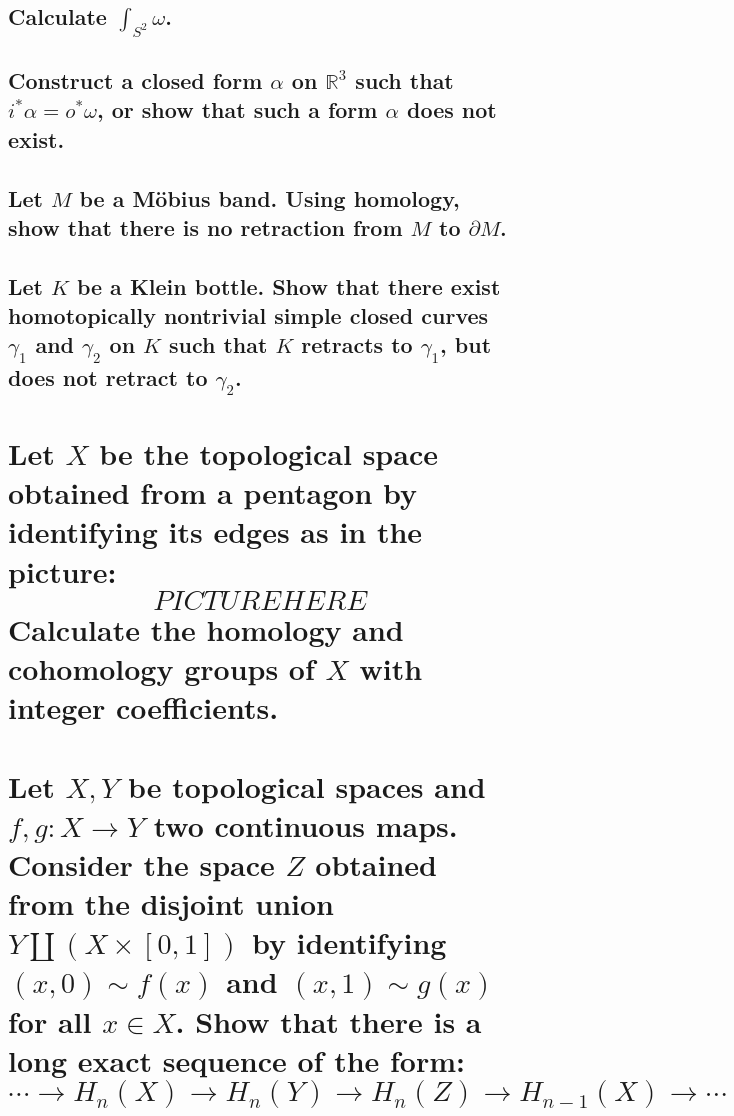 \documentclass[10pt]{article}
\newcommand{\del}{\ensuremath{\partial}}
\newcommand{\advsection}{\addtocounter{section}{1} \setcounter{subsection}{0}}
\begin{document}
\subsection{Calculate $\int_{S^2} \omega$.}

\subsection{Construct a closed form $\alpha$ on $\mathbb{R}^3$ such that $i^*\alpha = o^*\omega$, or
  show that such a form $\alpha$ does not exist.}

\advsection{}

\subsection{Let $M$ be a M\"obius band. Using homology, show that there is no retraction from $M$ to
$\del M$.}

\subsection{Let $K$ be a Klein bottle. Show that there exist homotopically nontrivial simple closed
  curves $\gamma_1$ and $\gamma_2$ on $K$ such that $K$ retracts to $\gamma_1$, but does not retract
  to $\gamma_2$. }

\section{Let $X$ be the topological space obtained from a pentagon by identifying its edges as in
  the picture:
  $$PICTURE HERE$$
  Calculate the homology and cohomology groups of $X$ with integer coefficients.}

\section{Let $X,Y$ be topological spaces and $f,g : X \to Y$ two continuous maps. Consider the space
  $Z$ obtained from the disjoint union $Y \amalg ( X \times [0,1])$ by identifying $(x,0) \sim
  f(x)$ and $(x,1) \sim g(x)$ for all $x \in X$. Show that there is a long exact sequence of the
  form:
  $$ \cdots \to H_n(X) \to H_n(Y) \to H_n(Z) \to H_{n-1}(X) \to \cdots$$}
\end{document}
